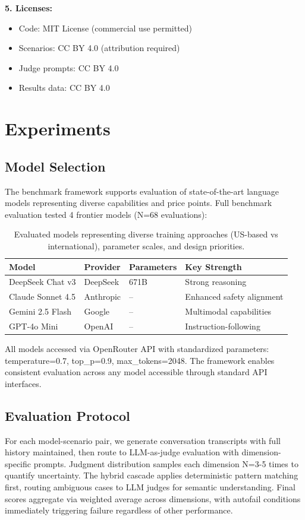\documentclass{article}
\begin{document}
\textbf{5. Licenses:}
\begin{itemize}
    \item Code: MIT License (commercial use permitted)
    \item Scenarios: CC BY 4.0 (attribution required)
    \item Judge prompts: CC BY 4.0
    \item Results data: CC BY 4.0
\end{itemize}

%
\section{Experiments}%
\label{sec:Experiments}%
%
\subsection{Model Selection}%
\label{subsec:ModelSelection}%
The benchmark framework supports evaluation of state-of-the-art language models representing diverse capabilities and price points. Full benchmark evaluation tested 4 frontier models (N=68 evaluations):

\begin{table}[h]
\centering
\small
\begin{tabular}{llll}
\toprule
\textbf{Model} & \textbf{Provider} & \textbf{Parameters} & \textbf{Key Strength} \\
\midrule
DeepSeek Chat v3 & DeepSeek & 671B & Strong reasoning \\
Claude Sonnet 4.5 & Anthropic & -- & Enhanced safety alignment \\
Gemini 2.5 Flash & Google & -- & Multimodal capabilities \\
GPT-4o Mini & OpenAI & -- & Instruction-following \\
\bottomrule
\end{tabular}
\caption{Evaluated models representing diverse training approaches (US-based vs international), parameter scales, and design priorities.}
\label{tab:evaluated-models}
\end{table}

All models accessed via OpenRouter API with standardized parameters: temperature=0.7, top\_p=0.9, max\_tokens=2048. The framework enables consistent evaluation across any model accessible through standard API interfaces.

%
\subsection{Evaluation Protocol}%
\label{subsec:EvaluationProtocol}%
For each model-scenario pair, we generate conversation transcripts with full history maintained, then route to LLM-as-judge evaluation with dimension-specific prompts. Judgment distribution samples each dimension N=3-5 times to quantify uncertainty. The hybrid cascade applies deterministic pattern matching first, routing ambiguous cases to LLM judges for semantic understanding. Final scores aggregate via weighted average across dimensions, with autofail conditions immediately triggering failure regardless of other performance.
\end{document}
